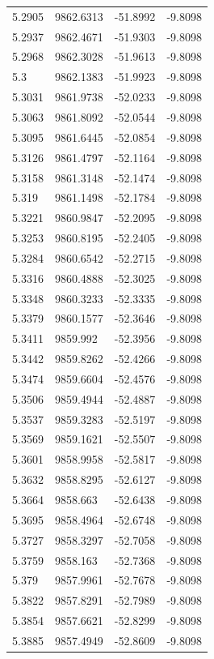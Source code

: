 \begin{table}[H]
\begin{tabular}{llll}
5.2905 & 9862.6313 & -51.8992 & -9.8098 \\
5.2937 & 9862.4671 & -51.9303 & -9.8098 \\
5.2968 & 9862.3028 & -51.9613 & -9.8098 \\
5.3 & 9862.1383 & -51.9923 & -9.8098 \\
5.3031 & 9861.9738 & -52.0233 & -9.8098 \\
5.3063 & 9861.8092 & -52.0544 & -9.8098 \\
5.3095 & 9861.6445 & -52.0854 & -9.8098 \\
5.3126 & 9861.4797 & -52.1164 & -9.8098 \\
5.3158 & 9861.3148 & -52.1474 & -9.8098 \\
5.319 & 9861.1498 & -52.1784 & -9.8098 \\
5.3221 & 9860.9847 & -52.2095 & -9.8098 \\
5.3253 & 9860.8195 & -52.2405 & -9.8098 \\
5.3284 & 9860.6542 & -52.2715 & -9.8098 \\
5.3316 & 9860.4888 & -52.3025 & -9.8098 \\
5.3348 & 9860.3233 & -52.3335 & -9.8098 \\
5.3379 & 9860.1577 & -52.3646 & -9.8098 \\
5.3411 & 9859.992 & -52.3956 & -9.8098 \\
5.3442 & 9859.8262 & -52.4266 & -9.8098 \\
5.3474 & 9859.6604 & -52.4576 & -9.8098 \\
5.3506 & 9859.4944 & -52.4887 & -9.8098 \\
5.3537 & 9859.3283 & -52.5197 & -9.8098 \\
5.3569 & 9859.1621 & -52.5507 & -9.8098 \\
5.3601 & 9858.9958 & -52.5817 & -9.8098 \\
5.3632 & 9858.8295 & -52.6127 & -9.8098 \\
5.3664 & 9858.663 & -52.6438 & -9.8098 \\
5.3695 & 9858.4964 & -52.6748 & -9.8098 \\
5.3727 & 9858.3297 & -52.7058 & -9.8098 \\
5.3759 & 9858.163 & -52.7368 & -9.8098 \\
5.379 & 9857.9961 & -52.7678 & -9.8098 \\
5.3822 & 9857.8291 & -52.7989 & -9.8098 \\
5.3854 & 9857.6621 & -52.8299 & -9.8098 \\
5.3885 & 9857.4949 & -52.8609 & -9.8098 \\

\end{tabular}
\end{table}
